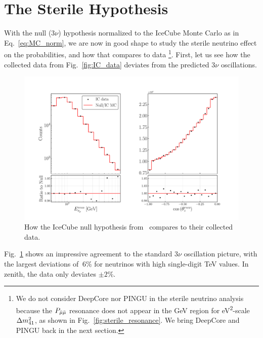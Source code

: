 \section{The Sterile Hypothesis}\label{sec:sterileResults}
With the null ($3\nu$) hypothesis normalized to the IceCube Monte Carlo as in Eq.~\ref{eq:MC_norm}, we are now in good shape to study the sterile neutrino effect on the probabilities, and how that compares to data
\footnote{We do not consider DeepCore nor PINGU in the sterile neutrino analysis because the $P_{\bar{\mu} \bar{\mu}}$ resonance does not appear in the \si{\GeV} region for \si{\eV^2}-scale $\dm[41]$, as shown in Fig.~\ref{fig:sterile_resonance}.
We bring DeepCore and PINGU back in the next section.}.
First, let us see how the collected data from Fig.~\ref{fig:IC_data} deviates from the predicted $3\nu$ oscillations.
\begin{figure}
    \centering
    \includegraphics[width=1\textwidth]{figures/IC_rates.pdf}
    \caption{How the IceCube null hypothesis from~\cite{IC2020} compares to their collected data.}\label{fig:IC_rates}
\end{figure}
Fig.~\ref{fig:IC_rates} shows an impressive agreement to the standard $3\nu$ oscillation picture, with the largest deviations of $~6\%$
for neutrinos with high single-digit \si{\TeV} values. In zenith, the data only deviates $\pm 2\%$.


